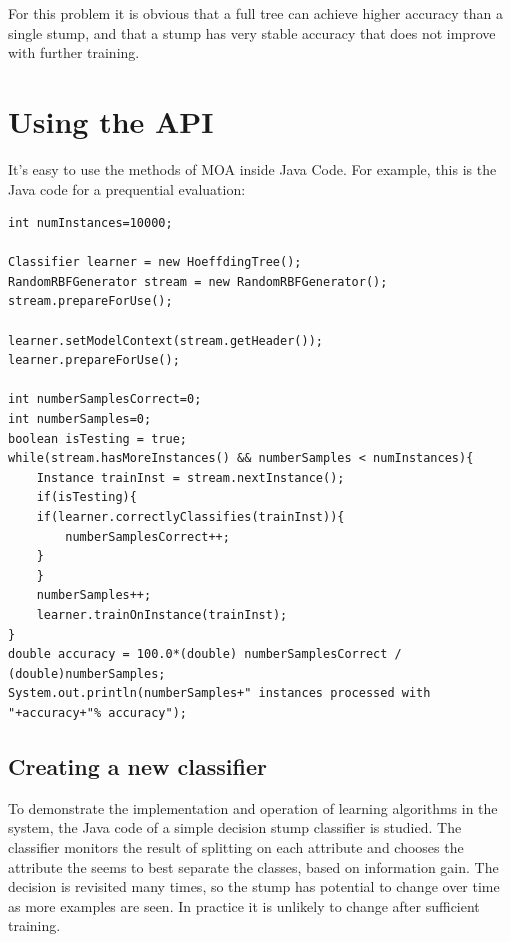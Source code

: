 \documentclass[a4paper,12pt,twoside]{book}
\begin{document}
For this problem it is obvious that a full tree can achieve higher accuracy than a single stump, and that a stump has very stable accuracy that does not improve with further training.



\chapter{Using the API} %

It's easy to use the methods of MOA inside Java Code. For example, this is the Java code for a prequential evaluation:

\begin{lstlisting}[caption={Java Code Example},label=lst:fullclassifier]
int numInstances=10000;

Classifier learner = new HoeffdingTree();
RandomRBFGenerator stream = new RandomRBFGenerator();
stream.prepareForUse();

learner.setModelContext(stream.getHeader());
learner.prepareForUse();

int numberSamplesCorrect=0;
int numberSamples=0;
boolean isTesting = true;
while(stream.hasMoreInstances() && numberSamples < numInstances){
    Instance trainInst = stream.nextInstance();
    if(isTesting){
	if(learner.correctlyClassifies(trainInst)){
	    numberSamplesCorrect++;
	}
    }
    numberSamples++;
    learner.trainOnInstance(trainInst);
}
double accuracy = 100.0*(double) numberSamplesCorrect / (double)numberSamples;
System.out.println(numberSamples+" instances processed with "+accuracy+"% accuracy");
\end{lstlisting}


\section{Creating a new classifier}

To demonstrate the implementation and operation of learning algorithms in the system, the Java code of a simple decision stump classifier is studied. The classifier monitors the result of splitting on each attribute and chooses the attribute the seems to best separate the classes, based on information gain. The decision is revisited many times, so the stump has potential to change over time as more examples are seen. In practice it is unlikely to change after sufficient training.
\end{document}
